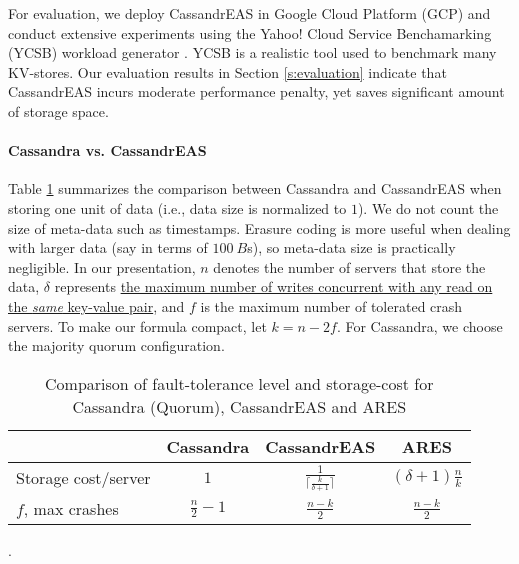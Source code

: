 For evaluation, we deploy CassandrEAS in Google Cloud Platform (GCP) and conduct extensive experiments using the Yahoo! Cloud Service Benchamarking (YCSB) workload generator \cite{YCSB:2010}. YCSB is a realistic tool used to benchmark many KV-stores.
Our evaluation results in Section \ref{s:evaluation} indicate that CassandrEAS incurs moderate performance penalty, yet saves significant amount of storage space.

\paragraph*{Cassandra vs. CassandrEAS}
Table \ref{t:comparison} summarizes the comparison between Cassandra and CassandrEAS when storing one unit of data (i.e., data size is normalized to $1$). We do not count the size of meta-data such as timestamps. Erasure coding is more useful when dealing with larger data (say in terms of $100~B$s), so meta-data size is practically negligible. 
In our presentation, $n$ denotes the number of servers that store the data, $\delta$ represents \underline{the maximum number of writes concurrent with any read on} \underline{the \textit{same} key-value pair}, and $f$ is the maximum number of tolerated crash servers.
To make our formula compact, let $k = n-2f$. For Cassandra, we choose the majority quorum configuration.

\begin{table}[h]
	\centering
	\begin{tabular}{ l|c|c|c}
		& Cassandra &  CassandrEAS  & ARES\\ \hline
		Storage cost/server & $1$ &  $\frac{1}{ \lceil\frac{k}{\delta+1}\rceil}$ 
		& $(\delta +1)\frac{n}{k}$ \\
	
		$f$, max crashes & $\frac{n}{2} - 1$  &  $\frac{n-k}{2}$ & $\frac{n-k}{2}$ \\%
	\end{tabular}
	\caption{Comparison of fault-tolerance level and storage-cost for Cassandra (Quorum), CassandrEAS and ARES}.
	\label{t:comparison}
\end{table}


